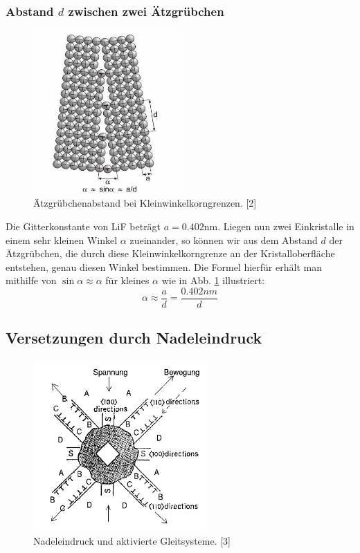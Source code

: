 	    \subsubsection*{Abstand $d$ zwischen zwei Ätzgrübchen}

		\begin{figure}[H]
	            \centering
	            \includegraphics[width=0.5\textwidth]{Images/Korn.JPG}
	            \caption{Ätzgrübchenabstand bei Kleinwinkelkorngrenzen. [2]}
	            \label{FigKorn}
	        \end{figure}
		Die Gitterkonstante von LiF beträgt $a = 0.402$nm. Liegen nun zwei Einkristalle in einem sehr kleinen Winkel $\alpha$ zueinander, so können wir aus dem Abstand $d$ der 
		Ätzgrübchen, die durch diese Kleinwinkelkorngrenze an der Kristalloberfläche entstehen, genau diesen Winkel bestimmen. Die Formel hierfür erhält man mithilfe
		von $\sin{\alpha} \approx \alpha$ für kleines $\alpha$ wie in Abb. \ref{FigKorn} illustriert:
		\begin{equation}
			\alpha \approx \frac{a}{d} = \frac{0.402nm}{d}
		\end{equation}


    \subsection{Versetzungen durch Nadeleindruck}
	\begin{figure}[H]
            \centering
            \includegraphics[width=0.6\textwidth]{Images/Question3.PNG}
            \caption{Nadeleindruck und aktivierte Gleitsysteme. [3]}
            \label{FigNadel}
        \end{figure}

